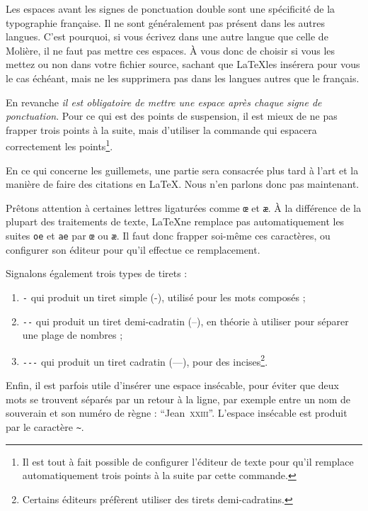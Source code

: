 \begin{attention}
Les espaces avant les signes de ponctuation double sont une spécificité de la typographie française. Il ne sont généralement pas présent dans les autres langues. C'est pourquoi, si vous écrivez dans une autre langue que celle de Molière, il ne faut pas mettre ces espaces. À vous donc de choisir si vous les mettez ou non dans votre fichier source, sachant que \LaTeX les insérera pour vous le cas échéant, mais ne les supprimera pas dans les langues autres que le français.
\end{attention}

En revanche \emph{il est obligatoire de mettre une espace après chaque signe de ponctuation}. Pour ce qui est des points de suspension, il est mieux de ne pas frapper trois points à la suite, mais d'utiliser la commande  qui espacera correctement les points\footnote{Il est tout à fait possible de configurer l'éditeur de texte pour qu'il remplace automatiquement trois points à la suite par cette commande.}.

En ce qui concerne les guillemets, une partie sera consacrée plus tard à l'art et la manière de faire des citations en \LaTeX. Nous n'en parlons donc pas maintenant.

Prêtons attention à certaines lettres ligaturées comme  \verb|œ| et  \verb|æ|. À la différence de la plupart des traitements de texte, \LaTeX ne remplace pas automatiquement les suites \verb|oe| et \verb|ae| par \verb|œ| ou \verb|æ|. Il faut donc frapper soi-même ces caractères, ou configurer son éditeur pour qu'il effectue ce remplacement.

Signalons également trois types de tirets\label{tirets} :
\begin{enumerate}
\item \verb|-| qui produit un tiret simple (-), utilisé pour les mots composés ;
\item \verb|--| qui produit un tiret demi-cadratin (--), en théorie à utiliser pour séparer une plage de nombres ;
\item \verb|---| qui produit un tiret cadratin (---), pour des incises\footnote{Certains éditeurs préfèrent utiliser des tirets demi-cadratins.}.
\end{enumerate}
 
Enfin, il est parfois utile d'insérer une espace insécable, pour éviter que deux mots se trouvent séparés par un retour à la ligne, par exemple entre un nom de souverain et son numéro de règne : \enquote{Jean~\textsc{xxiii}}.  L'espace insécable est produit par le caractère \verb|~|.



